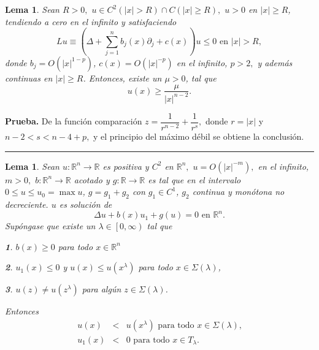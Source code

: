 \documentclass{article}
\newtheorem{lemma}[theorem]{Lema}
\newenvironment{proof}[1][Prueba]{\textbf{#1.} }{\ \rule{0.5em}{0.5em}}
\begin{document}
\begin{lemma}
Sean $R>0,$ $u\in C^{2}\left( \left| x\right| >R\right) \cap C\left( \left|
x\right| \geq R\right) ,$ $u>0$ en $\left| x\right| \geq R$, tendiendo a
cero en el infinito y satisfaciendo 
\begin{equation*}
Lu\equiv \left( \Delta +\sum_{j=1}^{n}b_{j}\left( x\right) \partial
_{j}+c\left( x\right) \right) u\leq 0\text{ \ \ en }\left| x\right| >R,
\end{equation*}
donde $b_{j}=O\left( \left| x\right| ^{1-p}\right) $, $c\left( x\right)
=O\left( \left| x\right| ^{-p}\right) $ en el infinito, $p>2,$ y adem\'{a}s
continuas en $\left| x\right| \geq R$. Entonces, existe un $\mu >0$, tal que 
\begin{equation*}
u\left( x\right) \geq \frac{\mu }{\left| x\right| ^{n-2}}\text{.}
\end{equation*}
\end{lemma}

\begin{proof}
De la funci\'{o}n comparaci\'{o}n $z=\dfrac{1}{r^{n-2}}+\dfrac{1}{r^{s}},$
donde $r=\left\vert x\right\vert $ y \linebreak $n-2<s<n-4+p,$ y el
principio del m\'{a}ximo d\'{e}bil se obtiene la conclusi\'{o}n.
\end{proof}

\begin{lemma}
Sean $u:\mathbb{R}^{n}\rightarrow \mathbb{R}$ es positiva y $C^{2}$ en $%
\mathbb{R}^{n},$ $u=O(\left\vert x\right\vert ^{-m}),$ en el infinito, $m>0,$
$b:\mathbb{R}^{n}\rightarrow \mathbb{R}$ acotado y $g:\mathbb{R}\rightarrow 
\mathbb{R}$ es tal que en el intervalo $0\leq u\leq u_{0}=\max u$, $%
g=g_{1}+g_{2}$ con $g_{1}\in C^{1}$, $g_{2}$ continua y mon\'{o}tona no
decreciente. $u$ es soluci\'{o}n de 
\begin{equation}
\Delta u+b\left( x\right) u_{1}+g\left( u\right) =0\text{ \ \ en\ }\mathbb{R}%
^{n}\text{.}  \tag{13}
\end{equation}
Sup\'{o}ngase que existe un $\lambda \in \left[ 0,\infty \right) $ tal que

\textbf{1}. $b\left( x\right) \geq 0$ para todo $x\in \mathbb{R}^{n}$

\textbf{2}. $u_{1}\left( x\right) \leq 0$ y $u\left( x\right) \leq u\left(
x^{\lambda }\right) $ para todo $x\in \Sigma \left( \lambda \right) $,

\textbf{3}. $u\left( z\right) \neq u\left( z^{\lambda }\right) $ para
alg\'{u}n $z\in \Sigma \left( \lambda \right) $.

Entonces 
\begin{eqnarray*}
u\left( x\right) &<&u\left( x^{\lambda }\right) \text{ \ \ para todo \ }x\in
\Sigma \left( \lambda \right) \text{,} \\
u_{1}\left( x\right) &<&0\text{ \ \ para todo \ }x\in T_{\lambda }\text{.}
\end{eqnarray*}
\end{lemma}
\end{document}
